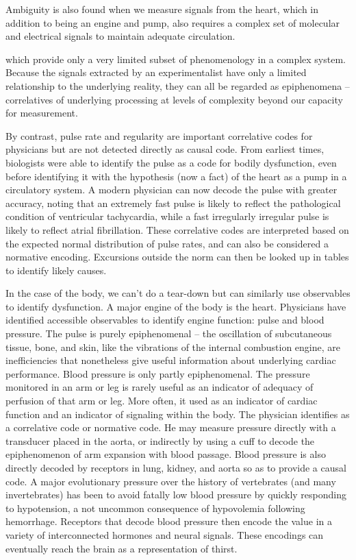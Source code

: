 \documentclass[12pt]{article}
\begin{document}
Ambiguity is also found when we measure signals from the heart, which in addition to being an engine and pump, also requires a complex set of molecular and electrical signals
to maintain adequate circulation.

which provide only a very limited subset of
phenomenology in a complex system. Because the signals extracted by an experimentalist have only a limited relationship to the underlying reality, they can all be regarded
as epiphenomena -- correlatives of underlying processing at levels of complexity beyond our capacity for measurement.

By contrast, pulse rate and regularity are important correlative codes for physicians but are not detected directly as causal code. From earliest times, biologists were able
to identify the pulse as a code for bodily dysfunction, even before identifying it with the hypothesis (now a fact) of the heart as a pump in a circulatory system. A modern
physician can now decode the pulse with greater accuracy, noting that an extremely fast pulse is likely to reflect the pathological condition of ventricular tachycardia, while
a fast irregularly irregular pulse is likely to reflect atrial fibrillation. These correlative codes are interpreted based on the expected normal distribution of pulse rates,
and can also be considered a normative encoding. Excursions outside the norm can then be looked up in tables to identify likely causes.

In the case of the body, we can't do a tear-down but can similarly use observables to identify dysfunction. A major engine of the body is the heart. Physicians have identified
accessible observables to identify engine function: pulse and blood pressure. The pulse is purely epiphenomenal -- the oscillation of subcutaneous tissue, bone, and skin, like
the vibrations of the internal combustion engine, are inefficiencies that nonetheless give useful information about underlying cardiac performance. 
Blood pressure is only partly epiphenomenal. The pressure monitored in an arm or leg is rarely useful as an indicator of adequacy of perfusion of that arm or leg. More often,
it used as an indicator of cardiac function and an indicator of signaling within the body. The physician identifies as a correlative code or normative code. He may measure pressure
directly with a transducer placed in the aorta, or indirectly by using a cuff to decode the epiphenomenon of arm expansion with blood passage. Blood pressure is also directly
decoded by receptors in lung, kidney, and aorta so as to provide a causal code. A major evolutionary pressure over the history of vertebrates (and many invertebrates) has been
to avoid fatally low blood pressure by quickly responding to hypotension, a not uncommon consequence of hypovolemia following hemorrhage. Receptors that decode blood pressure
then encode the value in a variety of interconnected hormones and neural signals. These encodings can eventually reach the brain as a representation of thirst.
\end{document}
